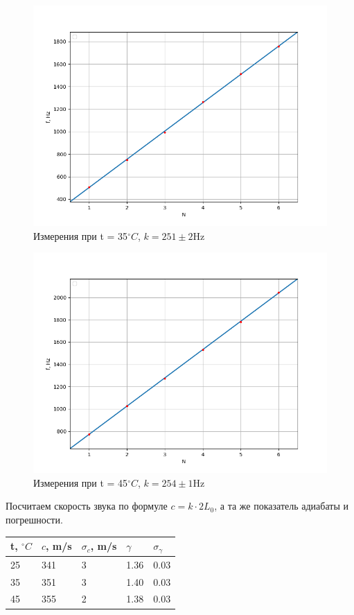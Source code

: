 \documentclass[12pt]{article}
\begin{document}
\begin{figure}[H]
	\centering
	\includegraphics[scale = 0.5]{T35.png}
	\caption{Измерения при t = 35$^\circ C$, $k = 251 \pm 2$Hz}
\end{figure}

\begin{figure}[H]
	\centering
	\includegraphics[scale = 0.5]{T45.png}
	\caption{Измерения при t = 45$^\circ C$, $k = 254 \pm 1$Hz}
\end{figure}

Посчитаем скорость звука по формуле $c = k\cdot 2L_0$, а та же показатель адиабаты и погрешности.

\begin{table}[H]
	\centering
	\begin{tabular}{|l|l|l|l|l|}
		\hline
		t, $^\circ C$ & $c$, m/s & $\sigma_c$, m/s & $\gamma$ & $\sigma_\gamma$ \\ \hline
		25            & 341      & 3               & 1.36     & 0.03            \\ \hline
		35            & 351      & 3               & 1.40     & 0.03            \\ \hline
		45            & 355      & 2               & 1.38     & 0.03            \\ \hline
	\end{tabular}
\end{table}
\end{document}
